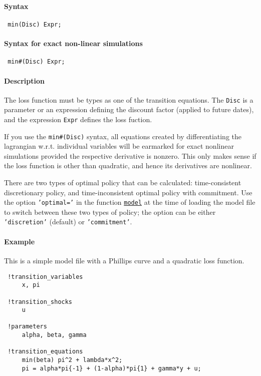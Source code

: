 


	\paragraph{Syntax}
 
 \begin{verbatim}
 min(Disc) Expr;
 \end{verbatim}
 
 \paragraph{Syntax for exact non-linear simulations}
 
 \begin{verbatim}
 min#(Disc) Expr;
 \end{verbatim}
 
 \paragraph{Description}
 
 The loss function must be types as one of the transition equations. The
 \texttt{Disc} is a parameter or an expression defining the discount
 factor (applied to future dates), and the expression \texttt{Expr}
 defines the loss fuction.
 
 If you use the \texttt{min\#(Disc)} syntax, all equations created by
 differentiating the lagrangian w.r.t. individual variables will be
 earmarked for exact nonlinear simulations provided the respective
 derivative is nonzero. This only makes sense if the loss function is
 other than quadratic, and hence its derivatives are nonlinear.
 
 There are two types of optimal policy that can be calculated:
 time-consistent discretionary policy, and time-inconsistent optimal
 policy with commitment. Use the option \texttt{'optimal='} in the
 function \href{model/model}{\texttt{model}} at the time of loading the
 model file to switch between these two types of policy; the option can
 be either \texttt{'discretion'} (default) or \texttt{'commitment'}.
 
 \paragraph{Example}
 
 This is a simple model file with a Phillips curve and a quadratic loss
 function.
 
 \begin{verbatim}
 !transition_variables
     x, pi
 
 !transition_shocks
     u
 
 !parameters
     alpha, beta, gamma
 
 !transition_equations
     min(beta) pi^2 + lambda*x^2;
     pi = alpha*pi{-1} + (1-alpha)*pi{1} + gamma*y + u;
 \end{verbatim}


